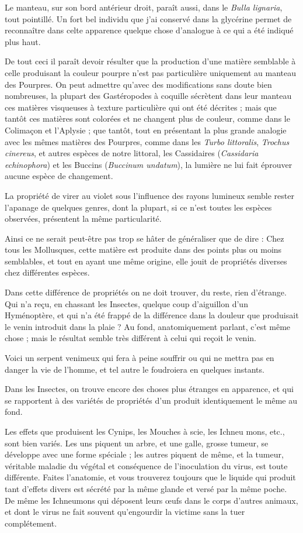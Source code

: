 \documentclass[a4paper, 11pt, oneside, polutonikogreek, french]{article}
\begin{document}
Le manteau, sur son bord antérieur droit, paraît aussi, dans le \emph{Bulla lignaria}, tout pointillé. Un fort bel individu que j'ai conservé dans la glycérine permet de reconnaître dans celte apparence quelque chose d'analogue à ce qui a été indiqué plus haut.

De tout ceci il paraît devoir résulter que la production d'une matière semblable à celle produisant la couleur pourpre n'est pas particulière uniquement au manteau des Pourpres. On peut admettre qu'avec des modifications sans doute bien nombreuses, la plupart des Gastéropodes à coquille sécrètent dans leur manteau ces matières visqueuses à texture particulière qui ont été décrites ; mais que tantôt ces matières sont colorées et ne changent plus de couleur, comme dans le Colimaçon et l'Aplysie ; que tantôt, tout en présentant la plus grande analogie avec les mêmes matières des Pourpres, comme dans les \emph{Turbo littoralis}, \emph{Trochus cinereus}, et autres espèces de notre littoral, les Cassidaires (\emph{Cassidaria echinophora}) et les Buccins (\emph{Buccinum undatum}), la lumière ne lui fait éprouver aucune espèce de changement.

La propriété de virer au violet sous l'influence des rayons lumineux semble rester l'apanage de quelques genres, dont la plupart, si ce n'est toutes les espèces observées, présentent la même particularité.

Ainsi ce ne serait peut-être pas trop se hâter de généraliser que de dire : Chez tous les Mollusques, cette matière est produite dans des points plus ou moins semblables, et tout en ayant une même origine, elle jouit de propriétés diverses chez différentes espèces.

Dans cette différence de propriétés on ne doit trouver, du reste, rien d'étrange. Qui n'a reçu, en chassant les Insectes, quelque coup d'aiguillon d'un Hyménoptère, et qui n'a été frappé de la différence dans la douleur que produisait le venin introduit dans la plaie ? Au fond, anatomiquement parlant, c'est même chose ; mais le résultat semble très différent à celui qui reçoit le venin.

Voici un serpent venimeux qui fera à peine souffrir ou qui ne mettra pas en danger la vie de l'homme, et tel autre le foudroiera en quelques instants.

Dans les Insectes, on trouve encore des choses plus étranges en apparence, et qui se rapportent à des variétés de propriétés d'un produit identiquement le même au fond.

Les effets que produisent les Cynips, les Mouches à scie, les Ichneu mons, etc., sont bien variés. Les uns piquent un arbre, et une galle, grosse tumeur, se développe avec une forme spéciale ; les autres piquent de même, et la tumeur, véritable maladie du végétal et conséquence de l'inoculation du virus, est toute différente. Faites l'anatomie, et vous trouverez toujours que le liquide qui produit tant d'effets divers est sécrété par la même glande et versé par la même poche. De même les Ichneumons qui déposent leurs œufs dans le corps d'autres animaux, et dont le virus ne fait souvent qu'engourdir la victime sans la tuer complétement.
\end{document}
